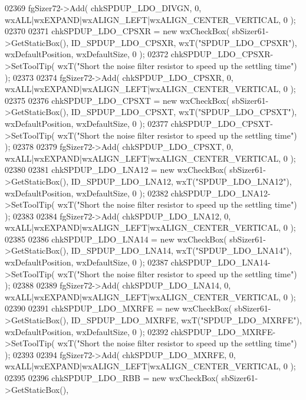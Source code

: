 \begin{DoxyCode}
02369     fgSizer72->Add( chkSPDUP_LDO_DIVGN, 0, wxALL|wxEXPAND|wxALIGN\_LEFT|wxALIGN\_CENTER\_VERTICAL, 0 );
02370     
02371     chkSPDUP_LDO_CPSXR = \textcolor{keyword}{new} wxCheckBox( sbSizer61->GetStaticBox(), 
      ID_SPDUP_LDO_CPSXR, wxT(\textcolor{stringliteral}{"SPDUP\_LDO\_CPSXR"}), wxDefaultPosition, wxDefaultSize, 0 );
02372     chkSPDUP_LDO_CPSXR->SetToolTip( wxT(\textcolor{stringliteral}{"Short the noise filter resistor to speed up the settling time"}) );
02373     
02374     fgSizer72->Add( chkSPDUP_LDO_CPSXR, 0, wxALL|wxEXPAND|wxALIGN\_LEFT|wxALIGN\_CENTER\_VERTICAL, 0 );
02375     
02376     chkSPDUP_LDO_CPSXT = \textcolor{keyword}{new} wxCheckBox( sbSizer61->GetStaticBox(), 
      ID_SPDUP_LDO_CPSXT, wxT(\textcolor{stringliteral}{"SPDUP\_LDO\_CPSXT"}), wxDefaultPosition, wxDefaultSize, 0 );
02377     chkSPDUP_LDO_CPSXT->SetToolTip( wxT(\textcolor{stringliteral}{"Short the noise filter resistor to speed up the settling time"}) );
02378     
02379     fgSizer72->Add( chkSPDUP_LDO_CPSXT, 0, wxALL|wxEXPAND|wxALIGN\_LEFT|wxALIGN\_CENTER\_VERTICAL, 0 );
02380     
02381     chkSPDUP_LDO_LNA12 = \textcolor{keyword}{new} wxCheckBox( sbSizer61->GetStaticBox(), 
      ID_SPDUP_LDO_LNA12, wxT(\textcolor{stringliteral}{"SPDUP\_LDO\_LNA12"}), wxDefaultPosition, wxDefaultSize, 0 );
02382     chkSPDUP_LDO_LNA12->SetToolTip( wxT(\textcolor{stringliteral}{"Short the noise filter resistor to speed up the settling time"}) );
02383     
02384     fgSizer72->Add( chkSPDUP_LDO_LNA12, 0, wxALL|wxEXPAND|wxALIGN\_LEFT|wxALIGN\_CENTER\_VERTICAL, 0 );
02385     
02386     chkSPDUP_LDO_LNA14 = \textcolor{keyword}{new} wxCheckBox( sbSizer61->GetStaticBox(), 
      ID_SPDUP_LDO_LNA14, wxT(\textcolor{stringliteral}{"SPDUP\_LDO\_LNA14"}), wxDefaultPosition, wxDefaultSize, 0 );
02387     chkSPDUP_LDO_LNA14->SetToolTip( wxT(\textcolor{stringliteral}{"Short the noise filter resistor to speed up the settling time"}) );
02388     
02389     fgSizer72->Add( chkSPDUP_LDO_LNA14, 0, wxALL|wxEXPAND|wxALIGN\_LEFT|wxALIGN\_CENTER\_VERTICAL, 0 );
02390     
02391     chkSPDUP_LDO_MXRFE = \textcolor{keyword}{new} wxCheckBox( sbSizer61->GetStaticBox(), 
      ID_SPDUP_LDO_MXRFE, wxT(\textcolor{stringliteral}{"SPDUP\_LDO\_MXRFE"}), wxDefaultPosition, wxDefaultSize, 0 );
02392     chkSPDUP_LDO_MXRFE->SetToolTip( wxT(\textcolor{stringliteral}{"Short the noise filter resistor to speed up the settling time"}) );
02393     
02394     fgSizer72->Add( chkSPDUP_LDO_MXRFE, 0, wxALL|wxEXPAND|wxALIGN\_LEFT|wxALIGN\_CENTER\_VERTICAL, 0 );
02395     
02396     chkSPDUP_LDO_RBB = \textcolor{keyword}{new} wxCheckBox( sbSizer61->GetStaticBox(), 

\end{DoxyCode}
